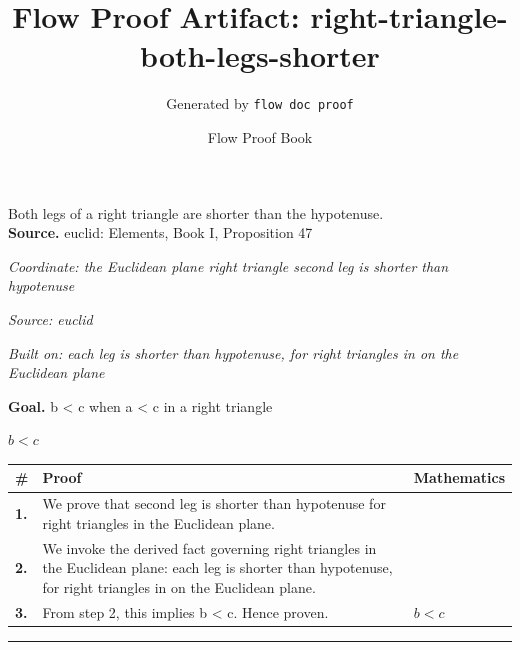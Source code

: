 \documentclass[11pt]{article}
\title{Flow Proof Artifact: right-triangle-both-legs-shorter}
\author{Generated by \texttt{flow doc proof}}
\date{Flow Proof Book}
\theoremstyle{definition}
\begin{document}
\maketitle
Both legs of a right triangle are shorter than the hypotenuse.\\[0.5em]
\textbf{Source.} euclid: Elements, Book I, Proposition 47\\[0.5em]
\bigskip
{}\par
\smallskip\noindent\textit{Coordinate: the Euclidean plane \cdot right triangle \cdot second leg is shorter than hypotenuse}\par
\smallskip\noindent\textit{Source: euclid}\par
\smallskip\noindent\textit{Built on: each leg is shorter than hypotenuse, for right triangles in on the Euclidean plane}\par
\medskip
\noindent\textbf{Goal.} b < c when a < c in a right triangle\par
\noindent$\displaystyle b < c$\par
\medskip
\noindent
\begin{tabular}{@{} >{\raggedright\arraybackslash}p{} >{\raggedright\arraybackslash}p{} >{\raggedleft\arraybackslash}p{} @{}}
\textbf{\#} & \textbf{Proof} & \textbf{Mathematics} \\
\midrule
\textbf{1.} & We prove that second leg is shorter than hypotenuse for right triangles in the Euclidean plane. & \\[0.45em]
\textbf{2.} & We invoke the derived fact governing right triangles in the Euclidean plane: each leg is shorter than hypotenuse, for right triangles in on the Euclidean plane. & \\[0.45em]
\textbf{3.} & From step 2, this implies b < c. Hence proven. & $\displaystyle b < c$ \\[0.45em]
\bottomrule
\end{tabular}
\label{thm:Geometry-right triangle-second_leg_is_shorter_than_hypotenuse}
\par\medskip\hrule
\end{document}
